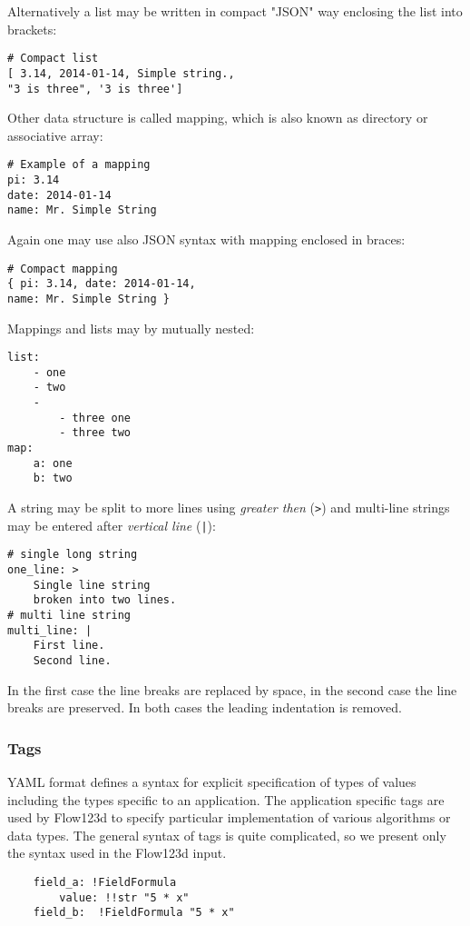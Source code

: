 Alternatively a list may be written in compact "JSON" way enclosing the list into brackets:
\begin{verbatim}
# Compact list
[ 3.14, 2014-01-14, Simple string.,
"3 is three", '3 is three'] 
\end{verbatim}

Other data structure is called mapping, which is also known as directory or associative array:
\begin{verbatim}
# Example of a mapping
pi: 3.14
date: 2014-01-14   
name: Mr. Simple String
\end{verbatim}

Again one may use also JSON syntax with mapping enclosed in braces:
\begin{verbatim}
# Compact mapping
{ pi: 3.14, date: 2014-01-14,   
name: Mr. Simple String }
\end{verbatim}

Mappings and lists may by mutually nested:
\begin{verbatim}
list:
    - one
    - two
    - 
        - three one 
        - three two
map:
    a: one 
    b: two
\end{verbatim}

A string may be split to more lines using {\it greater then} (\verb'>') and multi-line strings may be entered after {\it vertical line} (\verb'|'):
\begin{verbatim}
# single long string
one_line: >
    Single line string
    broken into two lines.
# multi line string
multi_line: |
    First line.
    Second line.
\end{verbatim}
In the first case the line breaks are replaced by space, in the second case the line breaks are preserved.
In both cases the leading indentation is removed.


\subsubsection{Tags}
YAML format defines a syntax for explicit specification of types of values including the types specific to an application.
The application specific tags are used by Flow123d to specify particular implementation of various algorithms or data types.
The general syntax of tags is quite complicated, so we present only the syntax used in the Flow123d input.
\begin{verbatim}
    field_a: !FieldFormula
        value: !!str "5 * x" 
    field_b:  !FieldFormula "5 * x"   
\end{verbatim}

